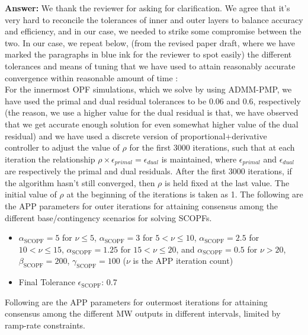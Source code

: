\documentclass[8pt]{article}
\begin{document}
\textbf{Answer: }We thank the reviewer for asking for clarification. We agree that it's very hard to reconcile the tolerances of inner and outer layers to balance accuracy and efficiency, and in our case, we needed to strike some compromise between the two. In our case, we repeat below, (from the revised paper draft, where we have marked the paragraphs in blue ink for the reviewer to spot easily) the different tolerances and means of tuning that we have used to attain reasonably accurate convergence within reasonable amount of time :\\
For the innermost OPF simulations, which we solve by using ADMM-PMP, we have used the primal and dual residual tolerances to be 0.06 and 0.6, respectively (the reason, we use a higher value for the dual residual is that, we have observed that we get accurate enough solution for even somewhat higher value of the dual residual) and we have used a discrete version of proportional+derivative controller to adjust the value of $\rho$ for the first 3000 iterations, such that at each iteration the relationship $\rho\times\epsilon_{primal}=\epsilon_{dual}$ is maintained, where $\epsilon_{primal}$ and $\epsilon_{dual}$ are respectively the primal and dual residuals. After the first 3000 iterations, if the algorithm hasn't still converged, then $\rho$ is held fixed at the last value. The initial value of $\rho$ at the beginning of the iterations is taken as 1. The following are the APP parameters for outer iterations for attaining consensus among the different base/contingency scenarios for solving SCOPFs.
\begin{itemize}
    \item $\alpha_{\text{SCOPF}}=5$ for $\nu\leq5$, $\alpha_{\text{SCOPF}}=3$ for $5<\nu\leq10$, $\alpha_{\text{SCOPF}}=2.5$ for $10<\nu\leq15$, $\alpha_{\text{SCOPF}}=1.25$ for $15<\nu\leq20$, and $\alpha_{\text{SCOPF}}=0.5$ for $\nu>20$, $\beta_{\text{SCOPF}}=200$, $\gamma_{\text{SCOPF}}=100$ ($\nu$ is the APP iteration count)
    \item Final Tolerance $\epsilon_{\text{SCOPF}}$: 0.7
\end{itemize}
Following are the APP parameters for outermost iterations for attaining consensus among the different MW outputs in different intervals, limited by ramp-rate constraints.
\end{document}

